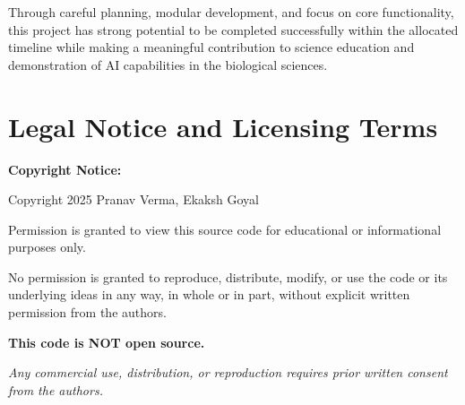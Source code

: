 \documentclass[12pt,a4paper]{article}
\begin{document}
Through careful planning, modular development, and focus on core functionality, this project has strong potential to be completed successfully within the allocated timeline while making a meaningful contribution to science education and demonstration of AI capabilities in the biological sciences.

\vspace{1cm}

\section*{Legal Notice and Licensing Terms}

\noindent\textbf{Copyright Notice:}

\vspace{0.3cm}

\noindent Copyright 2025 Pranav Verma, Ekaksh Goyal

\vspace{0.3cm}

\noindent Permission is granted to view this source code for educational or informational purposes only.

\vspace{0.3cm}

\noindent No permission is granted to reproduce, distribute, modify, or use the code or its underlying ideas in any way, in whole or in part, without explicit written permission from the authors.

\vspace{0.3cm}

\noindent\textbf{This code is NOT open source.}

\vspace{0.5cm}

\noindent\textit{Any commercial use, distribution, or reproduction requires prior written consent from the authors.}

\vspace{1cm}
\end{document}
